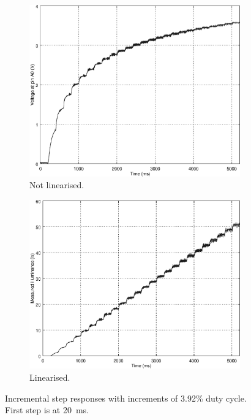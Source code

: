 \begin{figure}[h]
    \begin{subfigure}[t]{0.49\textwidth}
	\centering
	\includegraphics[width=.95\textwidth]{img/incstep_response}
	\caption{Not linearised.}
	\label{fig:incstep_response}
    \end{subfigure}
    \begin{subfigure}[t]{0.49\textwidth}
	\centering
	\includegraphics[width=.95\textwidth]{img/incstep_response_linearised}
	\caption{Linearised.}
	\label{fig:incstep_response_linearised}
    \end{subfigure}
    \caption{Incremental step responses with increments of 3.92\% duty cycle. First step is at \SI{20}{\milli\second}.}
    \label{fig:incstep}
\end{figure}
